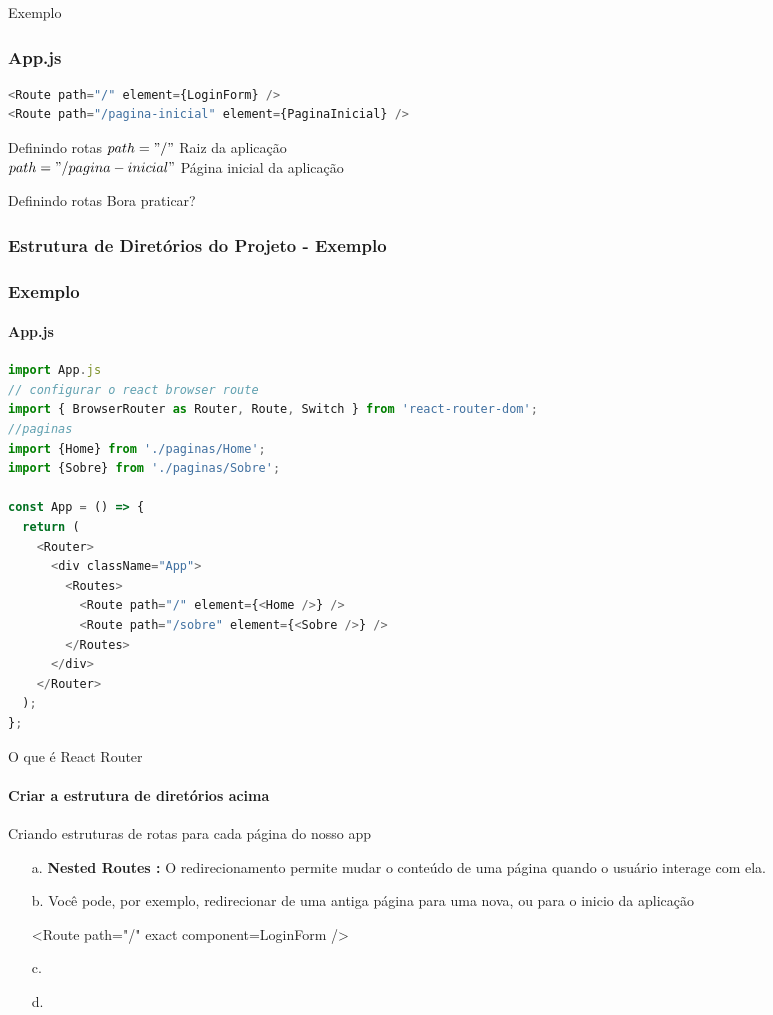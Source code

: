 \documentclass[13pt, xcolor={dvipsnames,svgnames}, portuguese]{beamer}
\begin{document}
\begin{frame}[fragile]{Exemplo}
\frametitle{App.js}
\begin{lstlisting}[language=JavaScript]
<Route path="/" element={LoginForm} />
<Route path="/pagina-inicial" element={PaginaInicial} />
\end{lstlisting}

\begin{alertblock}{Definindo rotas}
 $path="/"$ Raiz da aplicação \\
 $path="/pagina-inicial"$ Página inicial da aplicação
\end{alertblock}

\begin{alertblock}{Definindo rotas}
 Bora praticar?
\end{alertblock}

\end{frame}



\begin{frame}
\frametitle{Estrutura de Diretórios do Projeto - Exemplo}
\end{frame}


\begin{frame}[fragile]
\frametitle{Exemplo}
\framesubtitle{App.js}
\begin{lstlisting}[language=JavaScript]
import App.js
// configurar o react browser route
import { BrowserRouter as Router, Route, Switch } from 'react-router-dom';
//paginas
import {Home} from './paginas/Home';
import {Sobre} from './paginas/Sobre';

const App = () => {
  return (
    <Router>
      <div className="App">
        <Routes>
		  <Route path="/" element={<Home />} />
		  <Route path="/sobre" element={<Sobre />} />
        </Routes>
      </div>
    </Router>
  );
};
\end{lstlisting}

\end{frame}


\begin{frame}{O que é React Router}
\framesubtitle{Criar a estrutura de diretórios acima}
	\begin{block}{Criando estruturas de rotas para cada página do nosso app}
		\begin{itemize}
		  \item[a.] \textbf{Nested Routes :} O redirecionamento permite mudar o conteúdo de uma página quando o usuário interage com ela. 
		  \pause
		  \item[b.] Você pode, por exemplo, redirecionar de uma antiga página para uma nova, ou para o inicio da aplicação
		   \pause		  
		   
		   <Route path="/" exact component={LoginForm} />
		  \item[c.]  
		  \pause
		  \item[d.]
		\end{itemize}
	\end{block} 
\end{frame}
\end{document}

